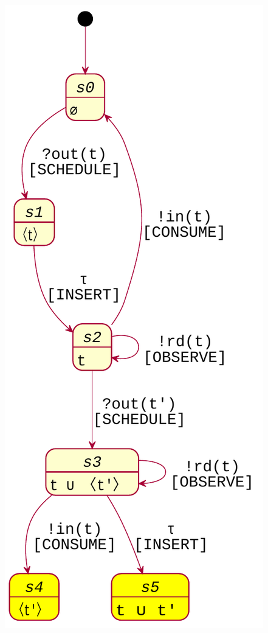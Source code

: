 \documentclass[handout]{beamer}\mode<presentation>{\usetheme{AMSCesenaBleu}}
\begin{document}
\begin{frame}
\begin{columns}
\begin{column}{.25\linewidth}
            \includegraphics[width=\linewidth]{res/img/ts_lts.pdf}
        \end{column}
    \end{columns}
    
\end{frame}
\end{document}
